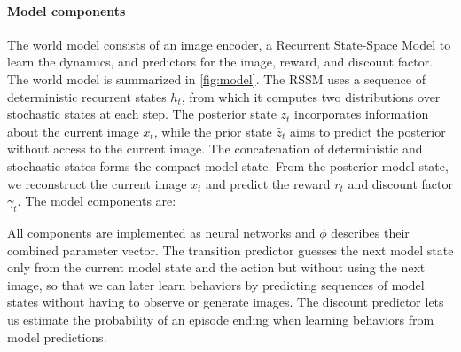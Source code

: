 \paragraph{Model components}

The world model consists of an image encoder, a Recurrent State-Space Model \citep[RSSM;][]{hafner2018planet} to learn the dynamics, and predictors for the image, reward, and discount factor. The world model is summarized in \cref{fig:model}. The RSSM uses a sequence of deterministic recurrent states $h_t$, from which it computes two distributions over stochastic states at each step. The posterior state $z_t$ incorporates information about the current image $x_t$, while the prior state $\hat{z}_t$ aims to predict the posterior without access to the current image. The concatenation of deterministic and stochastic states forms the compact model state. From the posterior model state, we reconstruct the current image $x_t$ and predict the reward $r_t$ and discount factor $\gamma_t$. The model components are:


All components are implemented as neural networks and $\phi$ describes their combined parameter vector. The transition predictor guesses the next model state only from the current model state and the action but without using the next image, so that we can later learn behaviors by predicting sequences of model states without having to observe or generate images. The discount predictor lets us estimate the probability of an episode ending when learning behaviors from model predictions.

